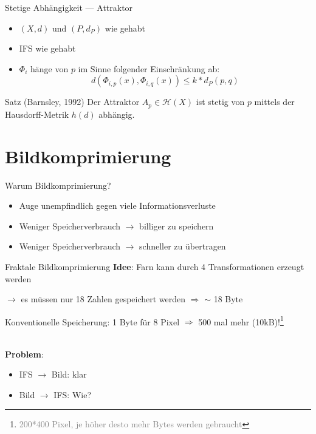 \documentclass[10pt]{beamer}
\begin{document}
\begin{frame}{Stetige Abhängigkeit --- Attraktor}
  \begin{itemize}
    \item \( (X,d) \) und \( (P, d_P) \) wie gehabt
    \item IFS wie gehabt
    \item \( \Phi_i \) hänge von \( p \) im Sinne folgender Einschränkung ab:
    \begin{equation*}
      d(\Phi_{i,p}(x), \Phi_{i,q}(x)) \leq k * d_P(p,q)
    \end{equation*}
  \end{itemize}
  \begin{block}{Satz (Barnsley, 1992)}
    Der Attraktor \( A_p \in \mathcal{H}(X) \) ist stetig von \( p \) mittels der Hausdorff-Metrik \( h(d) \) abhängig.
  \end{block}
\end{frame}

\section{Bildkomprimierung}

\begin{frame}{Warum Bildkomprimierung?}
  \begin{itemize}
    \item Auge unempfindlich gegen viele Informationsverluste
    \item Weniger Speicherverbrauch \( \to \) billiger zu speichern
    \item Weniger Speicherverbrauch \( \to \) schneller zu übertragen
  \end{itemize}
\end{frame}

\begin{frame}{Fraktale Bildkomprimierung}
  \textbf{Idee}: Farn kann durch 4 Transformationen erzeugt werden

  \( \to \) es müssen nur 18 Zahlen gespeichert werden \( \Rightarrow \) \alert{\( \sim \) 18 Byte}

  Konventionelle Speicherung: 1 Byte für 8 Pixel \( \Rightarrow \) \alert{500 mal mehr} (10kB)!\footnote{\scriptsize{\textcolor{gray}{200*400 Pixel, je höher desto mehr Bytes werden gebraucht}}}
  
  \  \\

  \pause{}
  \textbf{Problem}:
  \begin{itemize}
    \item IFS \( \to \) Bild: klar
    \item Bild \( \to \) IFS: Wie?
  \end{itemize}
\end{frame}
\end{document}
